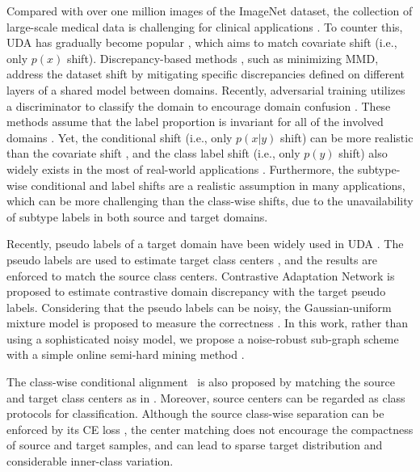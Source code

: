 Compared with over one million images of the ImageNet dataset, the collection of large-scale medical data is challenging for clinical applications \cite{liu2020unimodal,liu2018data,He_2020_CVPR_Workshopsb}. To counter this, UDA has gradually become popular \cite{zou2019confidence,liu2020energy}, which aims to match covariate shift (i.e., only $p(x)$ shift). Discrepancy-based methods \cite{long2015learning}, such as minimizing MMD, address the dataset shift by mitigating specific discrepancies defined on different layers of a shared model between domains. Recently, adversarial training utilizes a discriminator to classify the domain to encourage domain confusion \cite{tzeng2017adversarial,liu2020auto3d}. These methods assume that the label proportion is invariant for all of the involved domains \cite{moreno2012unifying}. Yet, the conditional shift \cite{magliacane2018domain} (i.e., only $p(x|y)$ shift) can be more realistic than the covariate shift \cite{zhao2019learning}, and the class label shift (i.e., only $p(y)$ shift) also widely exists in the most of real-world applications \cite{kouw2018introduction}. Furthermore, the subtype-wise conditional and label shifts are a realistic assumption in many applications, which can be more challenging than the class-wise shifts, due to the unavailability of subtype labels in both source and target domains.

Recently, pseudo labels of a target domain have been widely used in UDA \cite{zou2019confidence,liu2020energy}. The pseudo labels are used to estimate target class centers \cite{chen2019progressive}, and the results are enforced to match the source class centers. Contrastive Adaptation Network \cite{kang2019contrastive} is proposed to estimate contrastive domain discrepancy with the target pseudo labels. Considering that the pseudo labels can be noisy, the Gaussian-uniform mixture model is proposed to measure the correctness \cite{gu2020spherical}. In this work, rather than using a sophisticated noisy model, we propose a noise-robust sub-graph scheme with a simple online semi-hard mining method \cite{liu2017adaptive,liu2019hard}. 

 The class-wise conditional alignment~\cite{pan2019transferrable} is also proposed by matching the source and target class centers as in \cite{chen2019progressive}. Moreover, source centers can be regarded as class protocols for classification. Although the source class-wise separation can be enforced by its CE loss \cite{liu2016large}, the center matching does not encourage the compactness of source and target samples, and can lead to sparse target distribution and considerable inner-class variation.      

